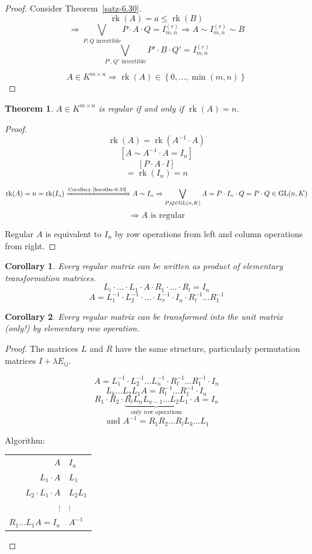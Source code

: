 \documentclass[a4paper,landscape,twocolumn]{article}
\newcommand\set[1]{\left\{#1\right\}}
\newtheorem{theorem}{Theorem}
\newtheorem{cor}{Corollary}
\begin{document}
\begin{proof}
  Consider Theorem~\ref{satz-6.30}.
  \[ \operatorname{rk}(A) = a \leq \operatorname{rk}(B) \]
  \[ \Rightarrow \bigvee_{P,Q \text{ invertible}} P \cdot A \cdot Q = I_{m,n}^{(r)} \Rightarrow A \sim I_{m,n}^{(r)} \sim B \]
  \[ \bigvee_{P', Q' \text{ invertible}} P' \cdot B \cdot Q' = I_{m,n}^{(r)} \]

  \[ A \in K^{m\times n} \Rightarrow \operatorname{rk}(A) \in \set{0, \ldots, \min(m,n)} \]
\end{proof}

\begin{theorem}
  \label{satz-6.34}
  $A \in K^{m\times n}$ is regular if and only if $\operatorname{rk}(A) = n$.
\end{theorem}
\begin{proof}
  \[ \operatorname{rk}(A) = \operatorname{rk}(A^{-1} \cdot A) \]
  \[ \left[ A \sim A^{-1} \cdot A = I_n \right] \]
  \[ \left[ P \cdot A \cdot I \right] \]
  \[ = \operatorname{rk}(I_n) = n \]

  \[
    \operatorname{rk}(A) = n = \operatorname{rk}(I_n)
    \xRightarrow{\text{Corollary~\ref{korollar-6.33}}}
    A \sim I_n \Rightarrow
    \bigvee_{P,Q \in \operatorname{GL}(n,K)} A
    = P \cdot I_n \cdot Q
    = P \cdot Q \in \operatorname{GL}(n, K)
  \]
  \[ \Rightarrow A \text{ is regular} \]

  Regular $A$ is equivalent to $I_n$ by row operations from left and column operations from right.
\end{proof}
%
\begin{cor}
  \label{korollar-6.35}
  Every regular matrix can be written as product of elementary transformation matrices.
  \[ L_i \cdot \ldots \cdot L_1 \cdot A \cdot R_1 \cdot \ldots \cdot R_l = I_n \]
  \[ A = L_1^{-1} \cdot L_{2}^{-1} \cdot \ldots \cdot L_r^{-1} \cdot I_n \cdot R_l^{-1} \ldots R_{1}^{-1} \]
\end{cor}
%
\begin{cor}
  \label{korollar-6.36}
  Every regular matrix can be transformed into the unit matrix (only!) by elementary row operation.
\end{cor}
\begin{proof}
  The matrices $L$ and $R$ have the same structure,
  particularly permutation matrices $I + \lambda E_{ij}$.

  \[ A = L_1^{-1} \cdot L_2^{-1} \ldots L_n^{-1} \cdot R_l^{-1} \ldots R_1^{-1} \cdot I_n \]
  \[ L_k \ldots L_2 L_1 A = R_l^{-1} \ldots R_1^{-1} \cdot I_n \]
  \[ R_1 \cdot R_2 \cdot \underbrace{R_l L_n L_{n-1} \ldots L_2 L_1}_{\text{only row operations}} \cdot A = I_n \]
  \[ \text{ and } A^{-1} = R_1 R_2 \ldots R_l L_k \ldots L_1 \]

  Algorithm:
  \begin{tabular}{r|l}
      $A$ & $I_n$ \\
      $L_1 \cdot A$ & $L_1$ \\
      $L_2 \cdot L_1 \cdot A$ & $L_2 L_1$ \\
      $\vdots$ & $\vdots$ \\
      $R_1 \ldots L_1 A = I_n$ & $A^{-1}$
  \end{tabular}
\end{proof}
\end{document}
